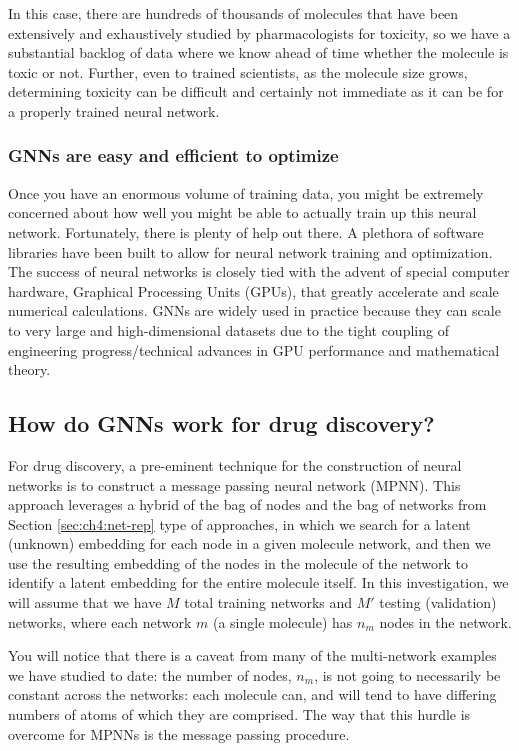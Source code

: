 In this case, there are hundreds of thousands of molecules that have been extensively and exhaustively studied by pharmacologists for toxicity, so we have a substantial backlog of data where we know ahead of time whether the molecule is toxic or not. Further, even to trained scientists, as the molecule size grows, determining toxicity can be difficult and certainly not immediate as it can be for a properly trained neural network.
\subsubsection*{GNNs are easy and efficient to optimize}

Once you have an enormous volume of training data, you might be extremely concerned about how well you might be able to actually train up this neural network. Fortunately, there is plenty of help out there. A plethora of software libraries have been built to allow for neural network training and optimization. The success of neural networks is closely tied with the advent of special computer hardware, Graphical Processing Units (GPUs), that greatly accelerate and scale numerical calculations. GNNs are widely used in practice because they can scale to very large and high-dimensional datasets due to the tight coupling of engineering progress/technical advances in GPU performance and mathematical theory.
\subsection{How do GNNs work for drug discovery?}

For drug discovery, a pre-eminent technique for the construction of neural networks is to construct a message passing neural network (MPNN). This approach leverages a hybrid of the bag of nodes and the bag of networks from Section \ref{sec:ch4:net-rep} type of approaches, in which we search for a latent (unknown) embedding for each node in a given molecule network, and then we use the resulting embedding of the nodes in the molecule of the network to identify a latent embedding for the entire molecule itself. In this investigation, we will assume that we have $M$ total training networks and $M'$ testing (validation) networks, where each network $m$ (a single molecule) has $n_m$ nodes in the network. 

You will notice that there is a caveat from many of the multi-network examples we have studied to date: the number of nodes, $n_m$, is not going to necessarily be constant across the networks: each molecule can, and will tend to have differing numbers of atoms of which they are comprised. The way that this hurdle is overcome for MPNNs is the message passing procedure. 

